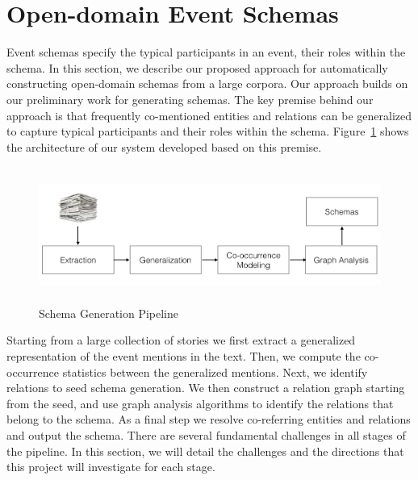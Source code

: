 \section{Open-domain Event Schemas}

Event schemas specify the typical participants in an event, their roles within the schema. In this section, we describe our proposed approach for automatically constructing open-domain schemas from a large corpora. Our approach builds on our preliminary work for generating schemas. The key premise behind our approach is that frequently co-mentioned entities and relations can be generalized to capture typical participants and their roles within the schema. Figure~\ref{fig:schema-generation} shows the architecture of our system developed based on this premise. 
\begin{figure}[htbp]
\vspace{-2ex}
\begin{center}
\includegraphics[height=1.75in, width=5.25in]{figures/schema-architecture}
\vspace{-4ex}
\caption{\label{fig:schema-generation}Schema Generation Pipeline}
\end{center}
\vspace{-2ex}
\end{figure}
Starting from a large collection of stories we first extract a generalized representation of the event mentions in the text. Then, we compute the co-occurrence statistics between the generalized mentions. Next, we identify relations to seed schema generation. We then construct a relation graph starting from the seed, and use graph analysis algorithms to identify the relations that belong to the schema. As a final step we resolve co-referring entities and relations and output the schema. 
There are several fundamental challenges in all stages of the pipeline. In this section, we will detail the challenges and the directions that this project will investigate for each stage.
 
